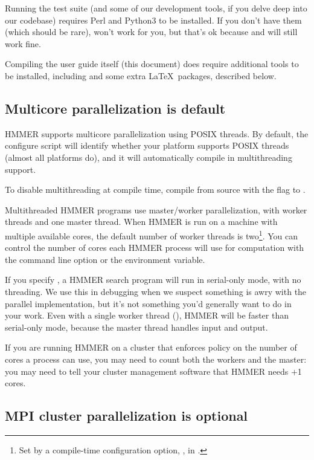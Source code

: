 Running the test suite (and some of our development tools, if you
delve deep into our codebase) requires Perl and Python3 to be
installed.  If you don't have them (which should be rare),  won't work for you, but that's ok because  and
 will still work fine.

Compiling the user guide itself (this document) does require
additional tools to be installed, including  and some extra
\LaTeX\ packages, described below.


\subsection{Multicore parallelization is default}

HMMER supports multicore parallelization using POSIX threads. By
default, the configure script will identify whether your platform
supports POSIX threads (almost all platforms do), and it will
automatically compile in multithreading support.

To disable multithreading at compile time, compile from source with
the  flag to .

Multithreaded HMMER programs use master/worker parallelization, with
 worker threads and one master thread. When HMMER is run on
a machine with multiple available cores, the default number of worker
threads is two\footnote{Set by a compile-time configuration option,
  , in .}. You can control the
number of cores each HMMER process will use for computation with the
 command line option or the 
environment variable.

If you specify , a HMMER search program will run in
serial-only mode, with no threading. We use this in debugging when we
suspect something is awry with the parallel implementation, but it's
not something you'd generally want to do in your work.  Even with a
single worker thread (), HMMER will be faster than
serial-only mode, because the master thread handles input and output.

If you are running HMMER on a cluster that enforces policy on the
number of cores a process can use, you may need to count both the
workers and the master: you may need to tell your cluster management
software that HMMER needs +1 cores.


\subsection{MPI cluster parallelization is optional}

